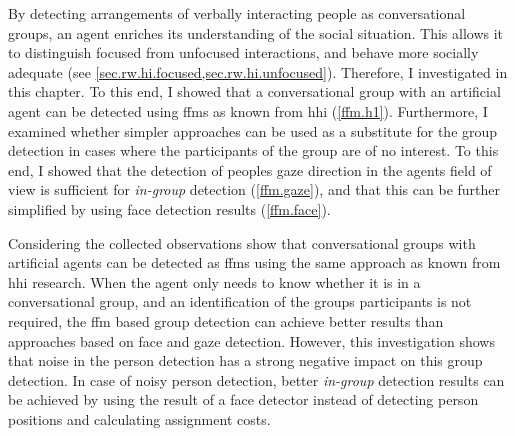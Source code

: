 By detecting arrangements of verbally interacting people as \glspl{conversational group}, an agent enriches its understanding of the social situation.
This allows it to distinguish focused from \glspl{unfocused interaction}, and behave more socially adequate (see \cref{sec.rw.hi.focused,sec.rw.hi.unfocused}).
Therefore, I investigated  in this chapter.
To this end, I showed that a \gls{conversational group} with an \gls{artificial agent} can be detected using \glspl{ffm} as known from \gls{hhi} (\cref{ffm.h1}).
Furthermore, I examined whether simpler approaches can be used as a substitute for the group detection in cases where the participants of the group are of no interest.
To this end, I showed that the detection of peoples gaze direction in the agents field of view is sufficient for \emph{in-group} detection (\cref{ffm.gaze}), and that this can be further simplified by using face detection results (\cref{ffm.face}).

Considering  the collected observations show that \glspl{conversational group} with \glspl{artificial agent} can be detected as \glspl{ffm} using the same approach as known from \gls{hhi} research.
When the agent only needs to know whether it is in a \gls{conversational group}, and an identification of the groups participants is not required, the \gls{ffm} based group detection can achieve better results than approaches based on face and gaze detection.
However, this investigation shows that noise in the person detection has a strong negative impact on this group detection.
In case of noisy person detection, better \emph{in-group} detection results can be achieved by using the result of a face detector instead of detecting person positions and calculating assignment costs.
